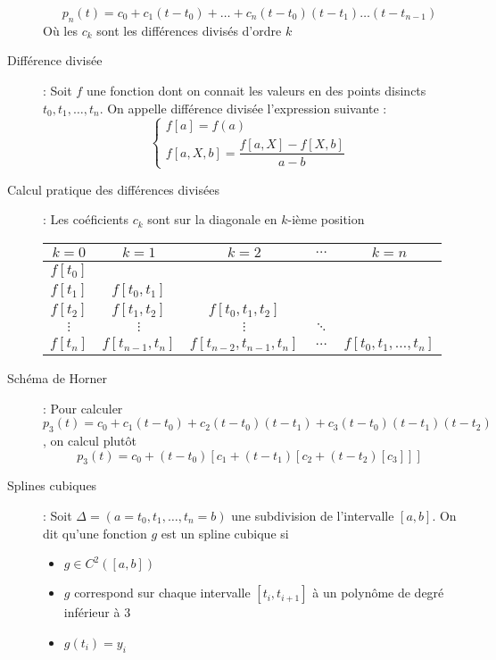 \begin{description}
    \[
        p_n(t) = c_0
            + c_1(t-t_0)
            + \dots +
            c_n(t-t_0)(t-t_1)\dots(t-t_{n-1})
    \]
    Où les $c_k$ sont les différences divisés d'ordre $k$
\item[Différence divisée] : Soit $f$ une fonction dont on connait les valeurs en des points disincts $t_0,t_1,\dots,t_n$. On appelle différence divisée l'expression suivante :
    \[
        \begin{cases}
            f[a]=f(a)\\
            f[a,X,b]=\dfrac{f[a,X]-f[X,b]}{a-b}
        \end{cases}
    \]
\item[Calcul pratique des différences divisées] : Les coéficients $c_k$ sont sur la diagonale en $k$-ième position \\
    \begin{center}
        \begin{tabular}{c|c|c|c|c}
            $k=0$ & $k=1$ & $k=2$ & $\dots$ & $k=n$ \\\hline
            $f[t_0]$ & & & & \\
            $f[t_1]$ & $f[t_0,t_1]$ & & \\
            $f[t_2]$ & $f[t_1,t_2]$ & $f[t_0,t_1, t_2]$ & & \\
            $\vdots$ & $\vdots$ & $\vdots$ & $\ddots$ & \\
            $f[t_n]$ & $f[t_{n-1},t_n]$ & $f[t_{n-2},t_{n-1},t_n]$ & $\hdots$ & $f[t_0,t_1,\dots,t_n]$
        \end{tabular}
    \end{center}
\item[Schéma de Horner] : Pour calculer $p_3(t)=c_0+c_1(t-t_0)+c_2(t-t_0)(t-t_1)+c_3(t-t_0)(t-t_1)(t-t_2)$, on calcul plutôt
    \[
        p_3(t) = c_0 + (t-t_0)[ c_1 + (t-t_1)[ c_2 + (t-t_2)[ c_3 ] ] ]
    \]
\item[Splines cubiques] : Soit $\Delta = (a=t_0,t_1,\dots,t_n=b)$ une subdivision de l'intervalle $[a,b]$. On dit qu'une fonction $g$ est un spline cubique si
    \begin{itemize}
        \item $g\in C^2([a,b])$
        \item $g$ correspond sur chaque intervalle $[t_i, t_{i+1}]$ à un polynôme de degré inférieur à $3$
        \item $g(t_i)=y_i$
    \end{itemize}
\end{description}